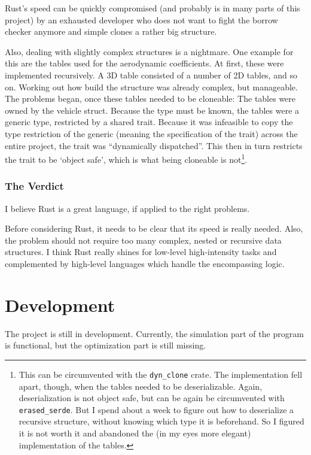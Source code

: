 Rust's speed can be quickly compromised (and probably is in many parts of this
project) by an exhausted developer who does not want to fight the borrow
checker anymore and simple clones a rather big structure.

Also, dealing with slightly complex structures is a nightmare. One example for
this are the tables used for the aerodynamic coefficients. At first, these
were implemented recursively. A 3D table consisted of a number of 2D tables,
and so on. Working out how build the structure was already complex, but
manageable. The problems began, once these tables needed to be cloneable: The
tables were owned by the vehicle struct. Because the type must be known, the
tables were a generic type, restricted by a shared trait. Because it was
infeasible to copy the type restriction of the generic (meaning the
specification of the trait) across the entire project, the trait was
``dynamically dispatched''. This then in turn restricts the trait to be
`object safe', which is what being cloneable is not\footnote{This can be circumvented with the
  \lstinline{dyn_clone} crate. The implementation fell apart, though, when the
  tables needed to be deserializable. Again, deserialization is not object safe,
  but can be again be circumvented with
  \lstinline{erased_serde}. But I spend about a week to figure out how to
  deserialize a recursive structure, without knowing which type it is
  beforehand. So I figured it is not worth it and abandoned the (in my eyes more
  elegant) implementation of the tables.}.

\subsubsection{The Verdict}\label{the-verdict}

I believe Rust is a great language, if applied to the right problems.

Before considering Rust, it needs to be clear that its speed is really needed.
Also, the problem should not require too many complex, nested or recursive
data structures. I think Rust really shines for low-level high-intensity tasks
and complemented by high-level languages which handle the encompassing logic.

\section{Development}\label{development}

The project is still in development. Currently, the simulation part of the
program is functional, but the optimization part is still missing.

